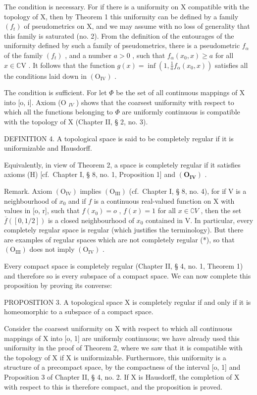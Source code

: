 The condition is necessary. For if there is a uniformity on X compatible with the topology of X, then by Theorem 1 this uniformity can be defined by a family \((f_{t})\) of pseudometrics on X, and we may assume with no loss of generality that this family is saturated (no. 2). From the definition of the entourages of the uniformity defined by such a family of pseudometrics, there is a pseudometric \(f_{\alpha}\) of the family \((f_{t})\) , and a number \(a > 0\) , such that \(f_{\alpha}(x_0, x) \geqslant a\) for all \(x \in \mathbb{C}\mathrm{V}\) . It follows that the function \(g(x) = \inf \left(1, \frac{1}{a} f_{\alpha}(x_0, x)\right)\) satisfies all the conditions laid down in \((\mathrm{O}_{\mathrm{IV}})\) .

The condition is sufficient. For let \(\Phi\) be the set of all continuous mappings of X into {[}o, i{]}. Axiom (O \(_{IV}\) ) shows that the coarsest uniformity with respect to which all the functions belonging to \(\Phi\) are uniformly continuous is compatible with the topology of X (Chapter II, § 2, no. 3).

DEFINITION 4. A topological space is said to be completely regular if it is uniformizable and Hausdorff.

Equivalently, in view of Theorem 2, a space is completely regular if it satisfies axioms (H) {[}cf.~Chapter I, § 8, no. 1, Proposition 1{]} and \((\mathbf{O}_{\mathbf{IV}})\) .

Remark. Axiom \((\mathrm{O}_{\mathrm{IV}})\) implies \((\mathrm{O}_{\mathrm{III}})\) (cf.~Chapter I, § 8, no. 4), for if V is a neighbourhood of \(x_0\) and if \(f\) is a continuous real-valued function on X with values in {[}o, r{]}, such that \(f(x_0) = o\) , \(f(x) = 1\) for all \(x \in \complement V\) , then the set \(\overline{f}([0, 1/2])\) is a closed neighbourhood of \(x_0\) contained in V. In particular, every completely regular space is regular (which justifies the terminology). But there are examples of regular spaces which are not completely regular (*), so that \((\mathrm{O}_{\mathrm{III}})\) does not imply \((\mathrm{O}_{\mathrm{IV}})\) .

Every compact space is completely regular (Chapter II, § 4, no. 1, Theorem 1) and therefore so is every subspace of a compact space. We can now complete this proposition by proving its converse:

PROPOSITION 3. A topological space X is completely regular if and only if it is homeomorphic to a subspace of a compact space.

Consider the coarsest uniformity on X with respect to which all continuous mappings of X into {[}o, 1{]} are uniformly continuous; we have already used this uniformity in the proof of Theorem 2, where we saw that it is compatible with the topology of X if X is uniformizable. Furthermore, this uniformity is a structure of a precompact space, by the compactness of the interval {[}o, 1{]} and Proposition 3 of Chapter II, § 4, no. 2. If X is Hausdorff, the completion of X with respect to this is therefore compact, and the proposition is proved.

